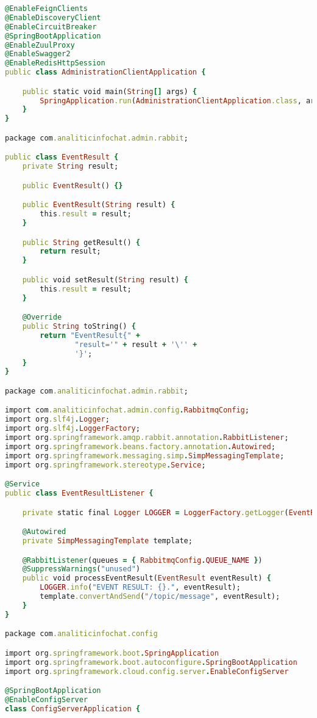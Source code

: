 \begin{lstlisting}[language=Ruby, style=rubystyle]
@EnableFeignClients
@EnableDiscoveryClient
@EnableCircuitBreaker
@SpringBootApplication
@EnableZuulProxy
@EnableSwagger2
@EnableRedisHttpSession
public class AdministrationClientApplication {

    public static void main(String[] args) {
        SpringApplication.run(AdministrationClientApplication.class, args);
    }
}

package com.analiticinfochat.admin.rabbit;

public class EventResult {
    private String result;

    public EventResult() {}

    public EventResult(String result) {
        this.result = result;
    }

    public String getResult() {
        return result;
    }

    public void setResult(String result) {
        this.result = result;
    }

    @Override
    public String toString() {
        return "EventResult{" +
                "result='" + result + '\'' +
                '}';
    }
}

package com.analiticinfochat.admin.rabbit;

import com.analiticinfochat.admin.config.RabbitmqConfig;
import org.slf4j.Logger;
import org.slf4j.LoggerFactory;
import org.springframework.amqp.rabbit.annotation.RabbitListener;
import org.springframework.beans.factory.annotation.Autowired;
import org.springframework.messaging.simp.SimpMessagingTemplate;
import org.springframework.stereotype.Service;

@Service
public class EventResultListener {

    private static final Logger LOGGER = LoggerFactory.getLogger(EventResult.class);

    @Autowired
    private SimpMessagingTemplate template;

    @RabbitListener(queues = { RabbitmqConfig.QUEUE_NAME })
    @SuppressWarnings("unused")
    public void processEventResult(EventResult eventResult) {
        LOGGER.info("EVENT RESULT: {}.", eventResult);
        template.convertAndSend("/topic/message", eventResult);
    }
}

package com.analiticinfochat.config

import org.springframework.boot.SpringApplication
import org.springframework.boot.autoconfigure.SpringBootApplication
import org.springframework.cloud.config.server.EnableConfigServer

@SpringBootApplication
@EnableConfigServer
class ConfigServerApplication {


\end{lstlisting}
